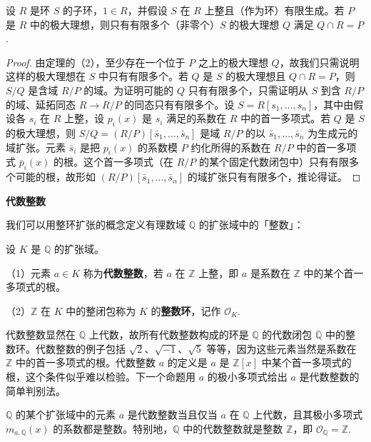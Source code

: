 \begin{corollary}\label{cor:15.27}
设 \(R\) 是环 \(S\) 的子环，\(1 \in R\)，并假设 \(S\) 在 \(R\) 上整且（作为环）有限生成。若 \(P\) 是 \(R\) 中的极大理想，则只有有限多个（非零个）\(S\) 的极大理想 \(Q\) 满足 \(Q \cap R = P\).
\end{corollary}

\begin{proof}
由定理的（2），至少存在一个位于 \(P\) 之上的极大理想 \(Q\)，故我们只需说明这样的极大理想在 \(S\) 中只有有限多个。若 \(Q\) 是 \(S\) 的极大理想且 \(Q \cap R = P\)，则 \(S/Q\) 是含域 \(R/P\) 的域。为证明可能的 \(Q\) 只有有限多个，只需证明从 \(S\) 到含 \(R/P\) 的域、延拓同态 \(R \to R/P\) 的同态只有有限多个。设 \(S = R[s_1, \ldots, s_n]\)，其中由假设各 \(s_i\) 在 \(R\) 上整，设 \(p_i(x)\) 是 \(s_i\) 满足的系数在 \(R\) 中的首一多项式。若 \(Q\) 是 \(S\) 的极大理想，则 \(S/Q = (R/P)[\bar s_1, \ldots, \bar s_n]\) 是域 \(R/P\) 的以 \(\bar s_1, \ldots, \bar s_n\) 为生成元的域扩张。元素 \(\bar s_i\) 是把 \(p_i(x)\) 的系数模 \(P\) 约化所得的系数在 \(R/P\) 中的首一多项式 \(\bar p_i(x)\) 的根。这个首一多项式（在 \(R/P\) 的某个固定代数闭包中）只有有限多个可能的根，故形如 \((R/P)[\bar s_1, \ldots, \bar s_n]\) 的域扩张只有有限多个，推论得证。
\end{proof}

\noindent\textbf{代数整数}

我们可以用整环扩张的概念定义有理数域 \(\mathbb{Q}\) 的扩张域中的「整数」：

\begin{definition}
设 \(K\) 是 \(\mathbb{Q}\) 的扩张域。

（1）元素 \(a \in K\) 称为\textbf{代数整数}，若 \(a\) 在 \(\mathbb{Z}\) 上整，即 \(a\) 是系数在 \(\mathbb{Z}\) 中的某个首一多项式的根。

（2）\(\mathbb{Z}\) 在 \(K\) 中的整闭包称为 \(K\) 的\textbf{整数环}，记作 \(\mathcal{O}_K\).
\end{definition}

代数整数显然在 \(\mathbb{Q}\) 上代数，故所有代数整数构成的环是 \(\mathbb{Q}\) 的代数闭包 \(\overline{\mathbb{Q}}\) 中的整数环。代数整数的例子包括 \(\sqrt{2}\)、\(\sqrt{-1}\)、\(\sqrt{5}\) 等等，因为这些元素当然是系数在 \(\mathbb{Z}\) 中的首一多项式的根。代数整数 \(a\) 的定义是 \(a\) 是 \(\mathbb{Z}[x]\) 中某个首一多项式的根，这个条件似乎难以检验。下一个命题用 \(a\) 的极小多项式给出 \(a\) 是代数整数的简单判别法。

\begin{proposition}\label{pro:15.28}
\(\mathbb{Q}\) 的某个扩张域中的元素 \(a\) 是代数整数当且仅当 \(a\) 在 \(\mathbb{Q}\) 上代数，且其极小多项式 \(m_{a,\mathbb{Q}}(x)\) 的系数都是整数。特别地，\(\mathbb{Q}\) 中的代数整数就是整数 \(\mathbb{Z}\)，即 \(\mathcal{O}_{\mathbb{Q}} = \mathbb{Z}\).
\end{proposition}

